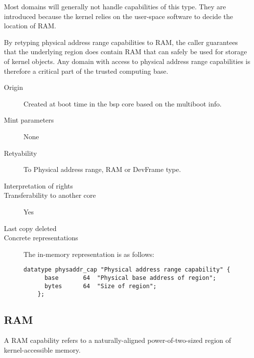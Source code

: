 Most domains will generally not handle capabilities of this type.
They are introduced because the kernel relies on the user-space
software to decide the location of RAM.

By retyping physical address range capabilities to RAM, the caller
guarantees that the underlying region does contain RAM that can safely
be used for storage of kernel objects.  Any domain with access to
physical address range capabilities is therefore a critical part of
the trusted computing base.

\begin{description}
\item[Origin] Created at boot time in the bsp core based on the
  multiboot info.

\item[Mint parameters] None
  
\item[Retyability] To Physical address range, RAM or DevFrame type.
  
\item[Interpretation of rights] 
  
\item[Transferability to another core] Yes

\item[Last copy deleted] 
  
\item[Concrete representations] The in-memory representation is as follows:
  
  \begin{lstlisting}[language=Mackerel]
    datatype physaddr_cap "Physical address range capability" {
      base       64  "Physical base address of region";
      bytes      64  "Size of region";
    };
  \end{lstlisting}
\end{description}

\subsection{RAM}

A RAM capability refers to a naturally-aligned power-of-two-sized
region of kernel-accessible memory.

